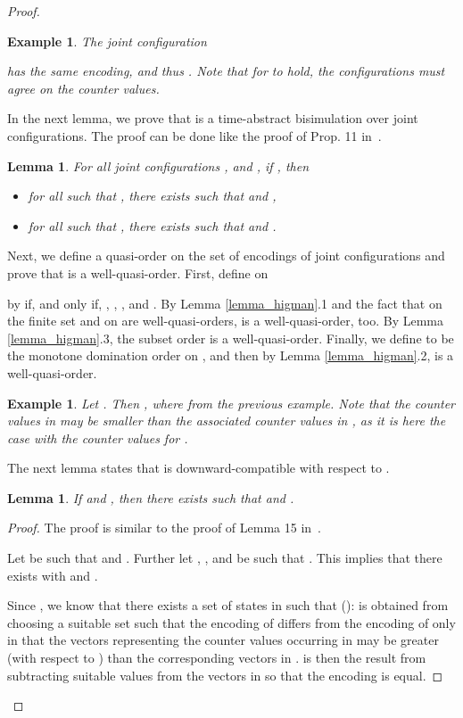 \documentclass{CSML}
\theoremstyle{plain}\newtheorem{theorem}[thm]{Theorem}
\theoremstyle{plain}\newtheorem{corollary}[thm]{Corollary}
\theoremstyle{plain}\newtheorem{example}[thm]{Example}
\theoremstyle{plain}\newtheorem{lemma}[thm]{Lemma}
\theoremstyle{plain}\newtheorem{remark}[thm]{Remark}
\begin{document}
\begin{proof}
\begin{example}
			The joint configuration 
			
			has the same encoding, and thus . Note that for  to hold, the configurations must agree on the counter values. 
		\end{example}
		In the next lemma, we prove that  is a time-abstract bisimulation over joint configurations. 
		The proof can be done like the proof of Prop. 11 in~\cite{DBLP:conf/lics/OuaknineW04}. 
		\begin{lemma}
			\label{lemma_bisim}
			For all joint configurations , and , if , then
			\begin{itemize}
			\item for all  such that , there exists  such that  and ,
			\item for all  such that , there exists  such that  and .
			\end{itemize}
		\end{lemma}
\noindent Next, we define a quasi-order  on the set of encodings of joint configurations and prove that  is a well-quasi-order. 
		First, define  on 
		 
		by  if, and only if, , , , and . 
		By Lemma \ref{lemma_higman}.1 and the fact that  on the finite set  and  on  are well-quasi-orders, 
		 is a well-quasi-order, too.
		By Lemma \ref{lemma_higman}.3, the subset order  is a well-quasi-order. 
		Finally, we define  to be the monotone domination order on , and then by Lemma \ref{lemma_higman}.2, 
		 is a well-quasi-order. 
		\begin{example}
Let .
			Then , where  from the previous example. Note that the counter values in  may be smaller than the associated counter values in , as it is here the case with the counter values for . 
		\end{example}		
		The next lemma states that  is downward-compatible with respect to . 
		\begin{lemma}
			\label{lemma_dc}
			If  and , then there exists  such that  and .
		\end{lemma}
		\begin{proof}
			The proof is similar to the proof of Lemma 15 in~\cite{DBLP:conf/lics/OuaknineW04}.
			
			Let  be such that  and .
			Further let 
			, 
			, 
			and  be such that \newline. 
			This implies that 
			there exists  with
			 and
			. 
			
			


			Since , 
			we know that there exists a set  of states in    such that
			 ():  is obtained from choosing a suitable set 
			such that the encoding of  differs from the encoding of  only in that the vectors representing the counter values occurring in  may be greater (with respect to ) than the corresponding vectors in .  
			  is then the result from subtracting suitable values from the vectors in  so that the encoding is equal. 



\end{proof}
\end{proof}
\end{document}
